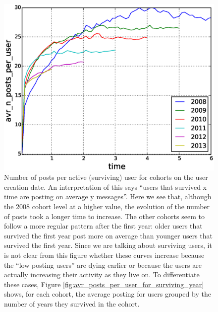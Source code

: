 \begin{figure}[!tb]
\centering
\includegraphics[scale=0.4]{./images/avr_posts_per_user_cohorts.eps}
\caption{Number of posts per active (surviving) user for cohorts on the user creation date. An interpretation of this says ``users that survived x time are posting on average y messages''. Here we see that, although the 2008 cohort level at a higher value, the evolution of the number of posts took a longer time to increase. The other cohorts seem to follow a more regular pattern after the first year: older users that survived the first year post more on average than younger users that survived the first year. Since we are talking about surviving users, it is not clear from this figure whether these curves increase because the ``low posting users'' are dying earlier or because the users are actually increasing their activity as they live on. To differentiate these cases, Figure \ref{fig:avr_posts_per_user_for_surviving_year} shows, for each cohort, the average posting for users grouped by the number of years they survived in the cohort.}
\label{fig:avr_posts_per_user_cohorts_relative}
\end{figure}

